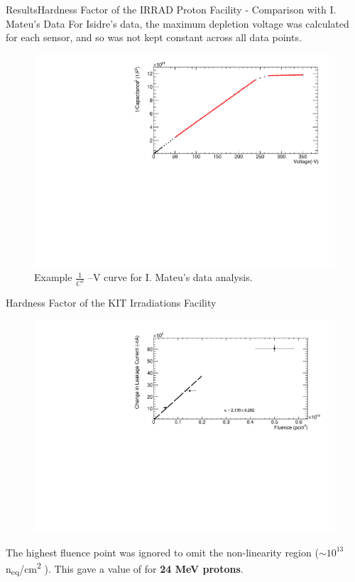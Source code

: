 \documentclass{beamer}
\begin{document}
    \begin{frame}{Results}{Hardness Factor of the IRRAD Proton Facility - Comparison with I. Mateu's Data}
    For Isidre's data, the maximum depletion voltage was calculated for each sensor, and so was not kept constant across all data points.
        \begin{figure}
            \centering
            \includegraphics[width = 0.9\linewidth]{IsidreCVexample.pdf}
            \caption{Example $\frac{1}{C^2}$ --V curve for I. Mateu's data analysis.}
        \end{figure}
    \end{frame}
    
    \begin{frame}{Hardness Factor of the KIT Irradiations Facility}
        \begin{figure}
            \centering
            \includegraphics[width = 0.8\linewidth]{KIT_seminar.pdf}
        \end{figure}
    The highest fluence point was ignored to omit the non-linearity region ($\sim 10^{13}$ n\textsubscript{eq}/cm\textsuperscript{2} \textsuperscript{\cite{Ravotti}}). This gave a value of  for \textbf{24 MeV protons}.    
    \end{frame}
    
\end{document}
